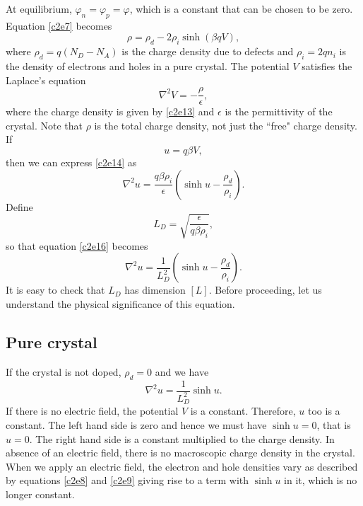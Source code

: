At equilibrium, $\varphi_n = \varphi_p = \varphi$, which is a constant that can
be chosen to be zero. Equation \eqref{c2e7} becomes
\begin{equation}\label{c2e13}
\rho = \rho_d - 2\rho_i\sinh(\beta qV),
\end{equation}
where $\rho_d = q(N_D - N_A)$ is the charge density due to defects and $\rho_i
= 2qn_i$ is the density of electrons and holes in a pure crystal. The potential
$V$ satisfies the Laplace's equation
\begin{equation}\label{c2e14}
\nabla^2 V = -\frac{\rho}{\epsilon},
\end{equation}
where the charge density is given by \eqref{c2e13} and $\epsilon$ is the 
permittivity of the crystal. Note that $\rho$ is the total charge density, not
just the ``free" charge density. If 
\begin{equation}\label{c2e15}
u = q\beta V,
\end{equation}
then we can express \eqref{c2e14} as
\begin{equation}\label{c2e16}
\nabla^2 u = \frac{q\beta\rho_i}{\epsilon}\left(\sinh u - \frac{\rho_d}{\rho_i}
\right).
\end{equation}
Define
\begin{equation}\label{c2e17}
L_D = \sqrt{\frac{\epsilon}{q\beta\rho_i}},
\end{equation}
so that equation \eqref{c2e16} becomes
\begin{equation}\label{c2e18}
\nabla^2 u = \frac{1}{L_D^2}\left(\sinh u - \frac{\rho_d}{\rho_i}\right).
\end{equation}
It is easy to check that $L_D$ has dimension $[L]$. Before proceeding, let us
understand the physical significance of this equation. 

\subsection{Pure crystal}
If the crystal is not doped, $\rho_d = 0$ and we have
\begin{equation}\label{c2e19}
\nabla^2 u = \frac{1}{L_D^2}\sinh u.
\end{equation}
If there is no electric field, the potential $V$ is a constant. Therefore, $u$
too is a constant. The left hand side is zero and hence we must have $\sinh u =
0$, that is $u = 0$. The right hand side is a constant multiplied to the charge
density. In absence of an electric field, there is no macroscopic charge density
in the crystal. When we apply an electric field, the electron and hole densities
vary as described by equations \eqref{c2e8} and \eqref{c2e9} giving rise to 
a term with $\sinh u$ in it, which is no longer constant.

